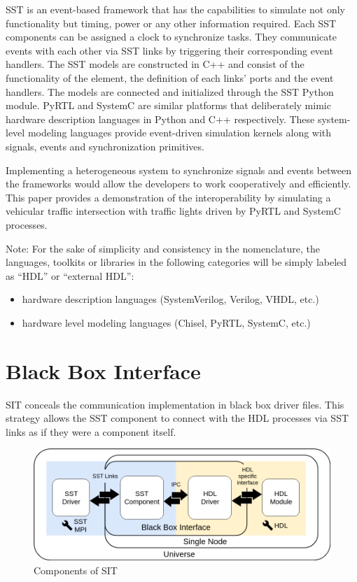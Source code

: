 \documentclass{article}
\begin{document}
  SST is an event-based framework that has the capabilities to simulate not only functionality but
  timing, power or any other information required. Each SST components can be assigned a clock to
  synchronize tasks. They communicate events with each other via SST links by triggering their
  corresponding event handlers. The SST models are constructed in C++ and consist of the
  functionality of the element, the definition of each links' ports and the event handlers. The
  models are connected and initialized through the SST Python module. PyRTL and SystemC are similar
  platforms that deliberately mimic hardware description languages in Python and C++ respectively.
  These system-level modeling languages provide event-driven simulation kernels along with signals,
  events and synchronization primitives.

  Implementing a heterogeneous system to synchronize signals and events between the frameworks would
  allow the developers to work cooperatively and efficiently. This paper provides a demonstration of
  the interoperability by simulating a vehicular traffic intersection with traffic lights driven by
  PyRTL and SystemC processes.

  Note: For the sake of simplicity and consistency in the nomenclature, the languages, toolkits or
  libraries in the following categories will be simply labeled as ``HDL'' or ``external HDL'':
  \begin{itemize}
    \item hardware description languages (SystemVerilog, Verilog, VHDL, etc.)
    \item hardware level modeling languages (Chisel, PyRTL, SystemC, etc.)
  \end{itemize}

  \section{Black Box Interface}
  SIT conceals the communication implementation in black box driver files. This strategy allows the
  SST component to connect with the HDL processes via SST links as if they were a component itself.

  \begin{figure}[!h]
    \centering
    \includegraphics[width=6.5in]{diagrams/comm.png}
    \caption{Components of SIT}
    \label{fig:comm}
  \end{figure}
\end{document}
